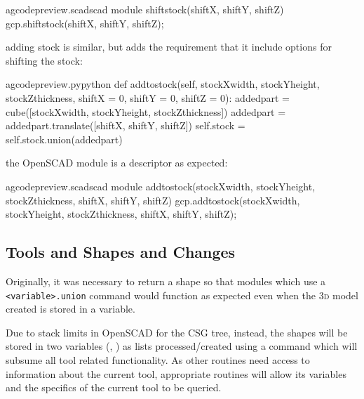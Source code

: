 \documentclass{ltxdoc}
\begin{document}
\lstset{firstnumber=\thegcpscad}
\begin{writecode}{a}{gcodepreview.scad}{scad}
module shiftstock(shiftX, shiftY, shiftZ) {
    gcp.shiftstock(shiftX, shiftY, shiftZ);
}

\end{writecode}
\addtocounter{gcpscad}{4}

\noindent adding stock is similar, but adds the requirement that it include options for shifting the stock:

\lstset{firstnumber=\thegcpy}
\begin{writecode}{a}{gcodepreview.py}{python}
    def addtostock(self, stockXwidth, stockYheight, stockZthickness, 
                         shiftX = 0, 
                         shiftY = 0, 
                         shiftZ = 0):
         addedpart = cube([stockXwidth, stockYheight, stockZthickness])
         addedpart = addedpart.translate([shiftX, shiftY, shiftZ])
         self.stock = self.stock.union(addedpart)
        
\end{writecode}
\addtocounter{gcpy}{8}

\noindent the OpenSCAD module is a descriptor as expected:

\lstset{firstnumber=\thegcpscad}
\begin{writecode}{a}{gcodepreview.scad}{scad}
module addtostock(stockXwidth, stockYheight, stockZthickness, shiftX, shiftY, shiftZ) {
    gcp.addtostock(stockXwidth, stockYheight, stockZthickness, shiftX, shiftY, shiftZ);
}

\end{writecode}
\addtocounter{gcpscad}{4}

\subsection{Tools and Shapes and Changes}

Originally, it was necessary to return a shape so that modules which use a \verb|<variable>.union| command would function as expected even when the \textsc{3d} model created is stored in a variable.

Due to stack limits in OpenSCAD for the CSG tree, instead, the shapes will be stored in two variables (, ) as lists processed/created using a command  which will subsume all tool related functionality. As other routines need access to information about the current tool, appropriate routines will allow its variables and the specifics of the current tool to be queried. 
\end{document}
